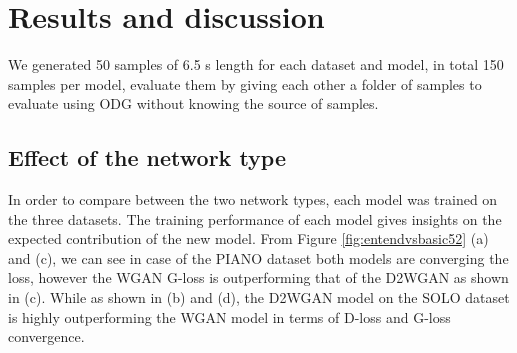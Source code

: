 \documentclass{article} %
\begin{document}
\section{Results and discussion}
We generated 50 samples of 6.5 s length for each dataset and model, in total 150 samples per model, evaluate them by giving each other a folder of samples to evaluate using ODG without knowing the source of samples.

\subsection{Effect of the network type}
In order to compare between the two network types, each model was trained on the three datasets. The training performance of each model gives insights on the expected contribution of the new model. From Figure \ref{fig:entendvsbasic52} (a) and (c), we can see in case of the PIANO dataset both models are converging the loss, however the WGAN G-loss is outperforming that of the D2WGAN as shown in (c). While as shown in (b) and (d), the D2WGAN model on the SOLO dataset is highly outperforming the WGAN model in terms of D-loss and G-loss convergence.
\end{document}
